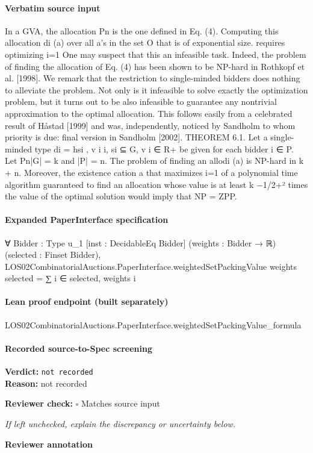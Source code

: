 \documentclass[10pt]{article}
\newcommand{\reviewerbox}{%
  \par\noindent\fbox{\parbox{0.96\linewidth}{\rule{0pt}{0.38in}}}\par
}
\newcommand{\reviewmatch}[1]{%
  \par\noindent\textbf{Reviewer check:} $\square$\; #1\par
  \noindent\emph{If left unchecked, explain the discrepancy or uncertainty below.}\par
}
\begin{document}
\paragraph{Verbatim source input}
\begin{ReviewVerbatim}
In a GVA, the allocation
Pn is the one defined in Eq. (4). Computing this allocation
di (a) over all a’s in the set O that is of exponential size.
requires optimizing i=1
One may suspect that this an infeasible task. Indeed, the problem of finding the
allocation of Eq. (4) has been shown to be NP-hard in Rothkopf et al. [1998]. We
remark that the restriction to single-minded bidders does nothing to alleviate the
problem. Not only is it infeasible to solve exactly the optimization problem, but
it turns out to be also infeasible to guarantee any nontrivial approximation to the
optimal allocation. This follows easily from a celebrated result of Håstad [1999]
and was, independently, noticed by Sandholm to whom priority is due: final version
in Sandholm [2002].
THEOREM 6.1. Let a single-minded type di = hsi , v i i, si ⊆ G, v i ∈ R+ be given
for each bidder i ∈ P. Let
Pn|G| = k and |P| = n. The problem of finding an allodi (a) is NP-hard in k + n. Moreover, the existence
cation a that maximizes i=1
of a polynomial time algorithm guaranteed to find an allocation whose value is at
least k −1/2+² times the value of the optimal solution would imply that NP = ZPP.
\end{ReviewVerbatim}


\paragraph{Expanded PaperInterface specification}
\begin{ReviewVerbatim}
∀ {Bidder : Type u_1} [inst : DecidableEq Bidder] (weights : Bidder → ℝ) (selected : Finset Bidder),
  LOS02CombinatorialAuctions.PaperInterface.weightedSetPackingValue weights selected = ∑ i ∈ selected, weights i
\end{ReviewVerbatim}

\paragraph{Lean proof endpoint (built separately)}\begin{ReviewVerbatim}
LOS02CombinatorialAuctions.PaperInterface.weightedSetPackingValue_formula
\end{ReviewVerbatim}

\paragraph{Recorded source-to-Spec screening}
\textbf{Verdict:} \texttt{not recorded}
\\
\textbf{Reason:} not recorded
\reviewmatch{Matches source input}
\noindent\textbf{Reviewer annotation}\par
\reviewerbox
\clearpage
\hypertarget{source-claim-caa2c2151c2ff699}{}
\end{document}
